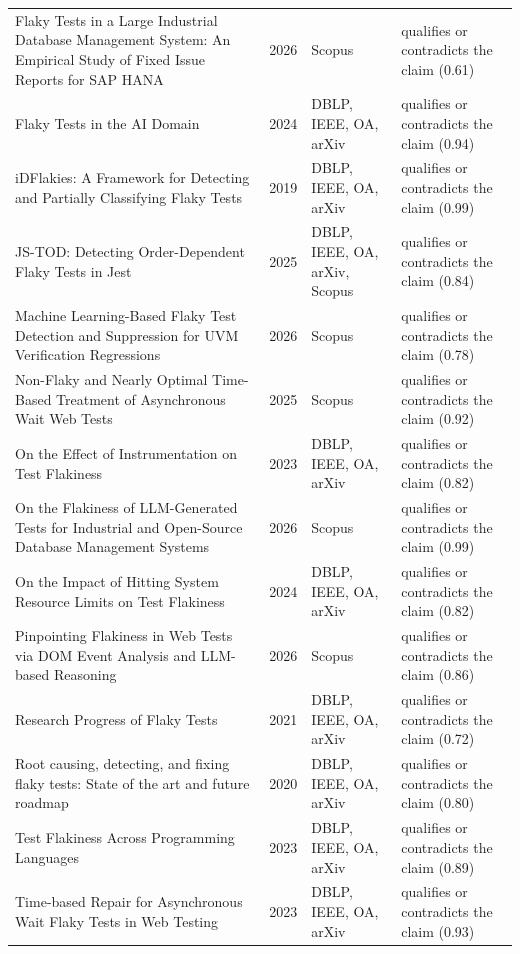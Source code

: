 \begin{longtable}{@{}%
  >{\raggedright\arraybackslash}p{}c%
  >{\raggedright\arraybackslash}p{}%
  >{\raggedright\arraybackslash}p{}@{}}
Flaky Tests in a Large Industrial Database Management System: An Empirical Study of Fixed Issue Reports for SAP HANA & 2026 & Scopus & qualifies or contradicts the claim (0.61) \\
Flaky Tests in the AI Domain & 2024 & DBLP, IEEE, OA, arXiv & qualifies or contradicts the claim (0.94) \\
iDFlakies: A Framework for Detecting and Partially Classifying Flaky Tests & 2019 & DBLP, IEEE, OA, arXiv & qualifies or contradicts the claim (0.99) \\
JS-TOD: Detecting Order-Dependent Flaky Tests in Jest & 2025 & DBLP, IEEE, OA, arXiv, Scopus & qualifies or contradicts the claim (0.84) \\
Machine Learning-Based Flaky Test Detection and Suppression for UVM Verification Regressions & 2026 & Scopus & qualifies or contradicts the claim (0.78) \\
Non-Flaky and Nearly Optimal Time-Based Treatment of Asynchronous Wait Web Tests & 2025 & Scopus & qualifies or contradicts the claim (0.92) \\
On the Effect of Instrumentation on Test Flakiness & 2023 & DBLP, IEEE, OA, arXiv & qualifies or contradicts the claim (0.82) \\
On the Flakiness of LLM-Generated Tests for Industrial and Open-Source Database Management Systems & 2026 & Scopus & qualifies or contradicts the claim (0.99) \\
On the Impact of Hitting System Resource Limits on Test Flakiness & 2024 & DBLP, IEEE, OA, arXiv & qualifies or contradicts the claim (0.82) \\
Pinpointing Flakiness in Web Tests via DOM Event Analysis and LLM-based Reasoning & 2026 & Scopus & qualifies or contradicts the claim (0.86) \\
Research Progress of Flaky Tests & 2021 & DBLP, IEEE, OA, arXiv & qualifies or contradicts the claim (0.72) \\
Root causing, detecting, and fixing flaky tests: State of the art and future roadmap & 2020 & DBLP, IEEE, OA, arXiv & qualifies or contradicts the claim (0.80) \\
Test Flakiness Across Programming Languages & 2023 & DBLP, IEEE, OA, arXiv & qualifies or contradicts the claim (0.89) \\
Time-based Repair for Asynchronous Wait Flaky Tests in Web Testing & 2023 & DBLP, IEEE, OA, arXiv & qualifies or contradicts the claim (0.93) \\
\end{longtable}
\endgroup
